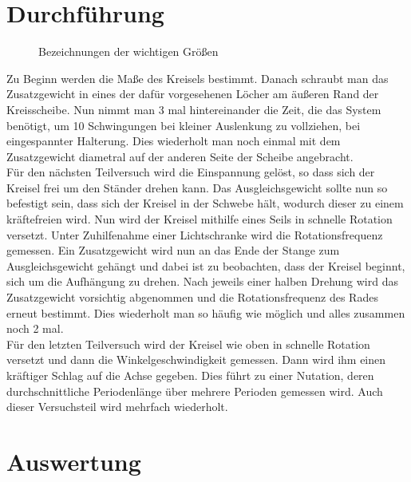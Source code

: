 \documentclass[12pt,a4paper,titlepage,headinclude,bibtotoc]{scrartcl}
\begin{document}
\section{Durchführung}
\label{sec:durchfuehrung}
 \begin{figure}[!htb]
 \centering \def\svgwidth{100pt}
 
\caption{Bezeichnungen der wichtigen Größen\label{img:wichtigegr}}
 \end{figure}
Zu Beginn werden die Maße des Kreisels bestimmt.
Danach schraubt man das Zusatzgewicht in eines der dafür vorgesehenen Löcher am äußeren Rand der Kreisscheibe.
Nun nimmt man 3 mal hintereinander die Zeit, die das System benötigt, um 10 Schwingungen bei kleiner Auslenkung zu vollziehen, bei eingespannter Halterung.
Dies wiederholt man noch einmal mit dem Zusatzgewicht diametral auf der anderen Seite der Scheibe angebracht.\\
Für den nächsten Teilversuch wird die Einspannung gelöst, so dass sich der Kreisel frei um den Ständer drehen kann.
Das Ausgleichsgewicht sollte nun so befestigt sein, dass sich der Kreisel in der Schwebe hält, wodurch dieser zu einem kräftefreien wird.
Nun wird der Kreisel mithilfe eines Seils in schnelle Rotation versetzt.
Unter Zuhilfenahme einer Lichtschranke wird die Rotationsfrequenz gemessen.
Ein Zusatzgewicht wird nun an das Ende der Stange zum Ausgleichsgewicht gehängt und dabei ist zu beobachten, dass der Kreisel beginnt, sich um die Aufhängung zu drehen.
Nach jeweils einer halben Drehung wird das Zusatzgewicht vorsichtig abgenommen und die Rotationsfrequenz des Rades erneut bestimmt.
Dies wiederholt man so häufig wie möglich und alles zusammen noch 2 mal.\\
Für den letzten Teilversuch wird der Kreisel wie oben in schnelle Rotation versetzt und dann die Winkelgeschwindigkeit gemessen.
Dann wird ihm einen kräftiger Schlag auf die Achse gegeben.
Dies führt zu einer Nutation, deren durchschnittliche Periodenlänge über mehrere Perioden gemessen wird.
Auch dieser Versuchsteil wird mehrfach wiederholt.


\section{Auswertung}
\label{sec:auswertung}
\end{document}

